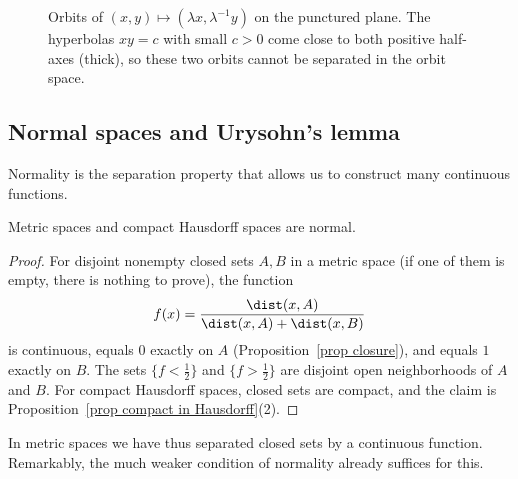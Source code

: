 \begin{figure}[tp]
    \centering
    \caption{Orbits of $(x,y)\mapsto(\lambda x,\lambda^{-1}y)$ on the punctured plane. The hyperbolas $xy=c$ with small $c>0$ come close to both positive half-axes (thick), so these two orbits cannot be separated in the orbit space.}
    \label{fig hyperbolic orbits}
\end{figure}

\subsection{Normal spaces and Urysohn's lemma}

Normality is the separation property that allows us to construct many continuous functions.

\begin{prop}\label{prop metric normal}
    Metric spaces and compact Hausdorff spaces are normal.
\end{prop}
\begin{proof}
    For disjoint nonempty closed sets $A,B$ in a metric space (if one of them is empty, there is nothing to prove), the function
    \[f(x)=\frac{\dist(x,A)}{\dist(x,A)+\dist(x,B)}\]
    is continuous, equals $0$ exactly on $A$ (Proposition~\ref{prop closure}), and equals $1$ exactly on $B$. The sets $\{f<\frac12\}$ and $\{f>\frac12\}$ are disjoint open neighborhoods of $A$ and $B$. For compact Hausdorff spaces, closed sets are compact, and the claim is Proposition~\ref{prop compact in Hausdorff}(2).
\end{proof}

In metric spaces we have thus separated closed sets by a continuous function. Remarkably, the much weaker condition of normality already suffices for this.

